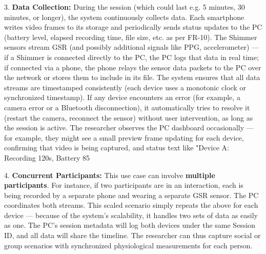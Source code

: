 3.  \textbf{Data Collection:} During the session (which could last e.g. 5
    minutes, 30 minutes, or longer), the system continuously collects
    data. Each smartphone writes video frames to its storage and
    periodically sends status updates to the PC (battery level, elapsed
    recording time, file size, etc. as per FR-10). The Shimmer sensors
    stream GSR (and possibly additional signals like PPG, accelerometer)
    --- if a Shimmer is connected directly to the PC, the PC logs that
    data in real time; if connected via a phone, the phone relays the
    sensor data packets to the PC over the network or stores them to
    include in its file. The system ensures that all data streams are
    timestamped consistently (each device uses a monotonic clock or
    synchronized timestamp). If any device encounters an error (for
    example, a camera error or a Bluetooth disconnection), it
    automatically tries to resolve it (restart the camera, reconnect the
    sensor) without user intervention, as long as the session is active.
    The researcher observes the PC dashboard occasionally --- for
    example, they might see a small preview frame updating for each
    device, confirming that video is being captured, and status text
    like "Device A: Recording 120s, Battery 85%

4.  \textbf{Concurrent Participants:} This use case can involve \textbf{multiple
    participants}. For instance, if two participants are in an
    interaction, each is being recorded by a separate phone and wearing
    a separate GSR sensor. The PC coordinates both streams. This scaled
    scenario simply repeats the above for each device --- because of the
    system's scalability, it handles two sets of data as easily as one.
    The PC's session metadata will log both devices under the same
    Session ID, and all data will share the timeline. The researcher can
    thus capture social or group scenarios with synchronized
    physiological measurements for each person.

